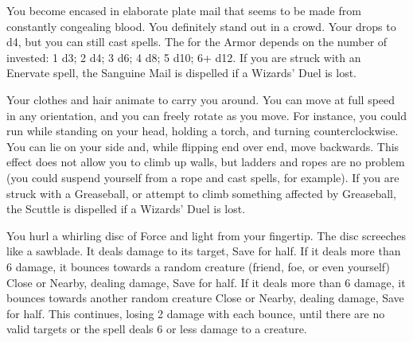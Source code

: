 {You become encased in elaborate plate mail that seems to be made from
constantly congealing blood.  You definitely stand out in a crowd. Your \MD
drops to d4, but you can still cast spells.  The \UD for the Armor depends
on the number of \DICE invested: 1 d3; 2 d4; 3 d6; 4 d8; 5 d10; 6+ d12.  If
you are struck with an Enervate spell, the Sanguine Mail is dispelled if a
Wizards' Duel is lost.





\SPELL[
  Name=Scuttle,
  Link=wizardry-scuttle,
  Paradigm=Biomancy,
  Save=N,
  Duration=Combat or \SUMDICE Minutes,
  Counter=\mylink{Greaseball}{wizardry-greaseball} ,
  Keywords=None,
  Target=Self
]



Your clothes and hair animate to carry you around. You can move at full
speed in any orientation, and you can freely rotate as you move. For
instance, you could run while standing on your head, holding a torch, and
turning counterclockwise. You can lie on your side and, while flipping end
over end, move backwards. This effect does not allow you to climb up walls,
but ladders and ropes are no problem (you could suspend yourself from a rope
and cast spells, for example).  If you are struck with a Greaseball, or
attempt to climb something affected by Greaseball, the Scuttle is dispelled
if a Wizards' Duel is lost.




\SPELL[
  Name=Scything Disc of Nog,
  Link=wizardry-scything-disc-of-nog,
  Paradigm=Force,
  Save=Y (half),
  Duration=0,
  Counter=None ,
  Keywords=None,
  Target=Nearby or Far Away Area
]



You hurl a whirling disc of Force and light from your fingertip. The disc
screeches like a sawblade. It deals \SUMDICE damage to its target, Save for
half. If it deals more than 6 damage, it bounces towards a random creature
(friend, foe, or even yourself) Close or Nearby, dealing 
damage, Save for half. If it deals more than 6 damage, it bounces towards
another random creature Close or Nearby, dealing  damage, Save for
half. This continues, losing 2 damage with each bounce, until there are no
valid targets or the spell deals 6 or less damage to a creature.





\SPELL[
  Name=Sleep,
  Link=wizardry-sleep,
  Paradigm=Mind,
  Save=Y (negate),
  Duration=Markovian,
  Counter=\mylink{Cacaphony}{wizardry-cacaphony} ,
  Keywords=None,
  Target=Close or Nearby Area
]



}
